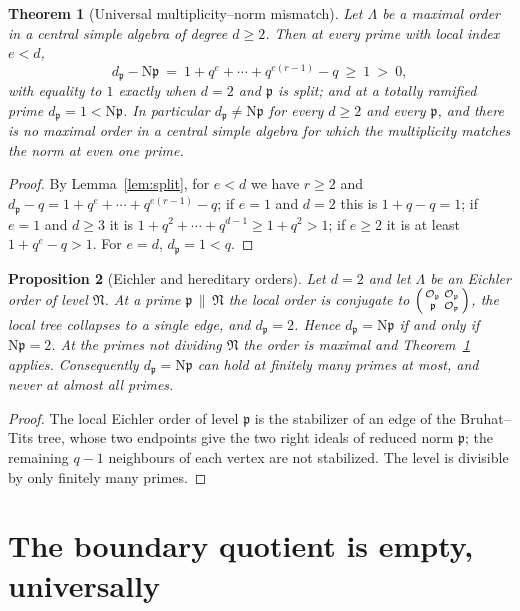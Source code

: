 \documentclass[11pt]{amsart}
\numberwithin{equation}{section}
\newtheorem{theorem}{Theorem}[section]
\newtheorem{proposition}[theorem]{Proposition}
\theoremstyle{definition}
\theoremstyle{remark}
\newcommand{\cO}{\mathcal{O}}
\newcommand{\pp}{\mathfrak{p}}
\newcommand{\Ns}{\mathrm{N}}
\begin{document}
\begin{theorem}[Universal multiplicity--norm mismatch]\label{thm:mismatch}
Let $\Lambda$ be a maximal order in a central simple algebra of degree $d\ge2$. Then at every
prime with local index $e<d$,
\[
d_\pp-\Ns\pp\ =\ 1+q^e+\cdots+q^{e(r-1)}-q\ \ge\ 1\ >\ 0 ,
\]
with equality to $1$ exactly when $d=2$ and $\pp$ is split; and at a totally ramified prime
$d_\pp=1<\Ns\pp$. In particular $d_\pp\ne\Ns\pp$ for every $d\ge2$ and every $\pp$, and there
is no maximal order in a central simple algebra for which the multiplicity matches the norm
at even one prime.
\end{theorem}

\begin{proof}
By Lemma~\ref{lem:split}, for $e<d$ we have $r\ge2$ and $d_\pp-q=1+q^e+\cdots+q^{e(r-1)}-q$;
if $e=1$ and $d=2$ this is $1+q-q=1$; if $e=1$ and $d\ge3$ it is $1+q^2+\cdots+q^{d-1}\ge1+q^2>1$;
if $e\ge2$ it is at least $1+q^e-q>1$. For $e=d$, $d_\pp=1<q$.
\end{proof}

\begin{proposition}[Eichler and hereditary orders]\label{prop:eichler}
Let $d=2$ and let $\Lambda$ be an Eichler order of level $\mathfrak N$. At a prime
$\pp\,\|\,\mathfrak N$ the local order is conjugate to
$\begin{psmallmatrix}\cO_\pp&\cO_\pp\\\pp&\cO_\pp\end{psmallmatrix}$, the local tree collapses
to a single edge, and $d_\pp=2$. Hence $d_\pp=\Ns\pp$ if and only if $\Ns\pp=2$. At the
primes not dividing $\mathfrak N$ the order is maximal and Theorem~\ref{thm:mismatch} applies.
Consequently $d_\pp=\Ns\pp$ can hold at finitely many primes at most, and never at almost all
primes.
\end{proposition}

\begin{proof}
The local Eichler order of level $\pp$ is the stabilizer of an edge of the Bruhat--Tits tree,
whose two endpoints give the two right ideals of reduced norm $\pp$; the remaining
$q-1$ neighbours of each vertex are not stabilized. The level is divisible by only finitely
many primes.
\end{proof}

\section{The boundary quotient is empty, universally}
\end{document}

